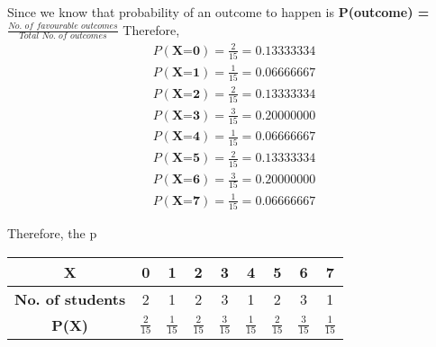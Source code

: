 \documentclass[journal,12pt,twocolumn]{IEEEtran}
\begin{document}
Since we know that probability of an outcome to happen is \textbf{P(outcome) = $\frac{\textit{No. of favourable outcomes}} {\textit{Total No. of outcomes}}$}
Therefore, 
\begin{align*}
    P(\textbf{X=0}) = \frac {2}{15} = 0.13333334
   \\ P(\textbf{X=1}) = \frac {1}{15} = 0.06666667
   \\ P(\textbf{X=2}) = \frac {2}{15} = 0.13333334
   \\ P(\textbf{X=3}) = \frac {3}{15} = 0.20000000
   \\P(\textbf{X=4}) = \frac {1}{15} = 0.06666667
   \\ P(\textbf{X=5}) = \frac {2}{15} = 0.13333334
   \\ P(\textbf{X=6}) = \frac {3}{15} = 0.20000000
   \\ P(\textbf{X=7}) = \frac {1}{15} = 0.06666667
\end{align*}

Therefore, the p
\begin{center}
\begin{tabular}{|c|c|c|c|c|c|c|c|c|}
\hline
\textbf{X} & 0 & 1 & 2 & 3 & 4 & 5 & 6 & 7 \\
\hline
\textbf{No. of students} & 2 & 1 & 2 & 3 & 1 & 2 & 3 & 1 \\
\hline
\textbf{P(X)} & $\frac {2}{15}$ & $\frac {1}{15}$ & $\frac {2}{15}$ & $\frac {3}{15}$ & $\frac {1}{15}$ & $\frac {2}{15}$ & $\frac {3}{15}$ & $\frac {1}{15}$ \\
\hline 
\end{tabular}
\end{center}
\end{document}
